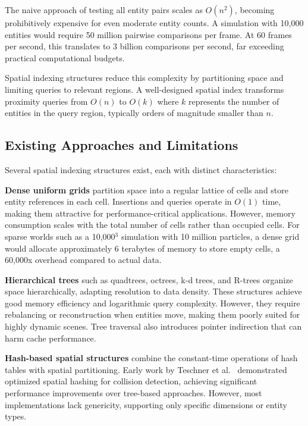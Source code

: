 \documentclass[11pt]{article}
\begin{document}
The naive approach of testing all entity pairs scales as $O(n^2)$, becoming prohibitively expensive for even moderate entity counts. A simulation with 10,000 entities would require 50 million pairwise comparisons per frame. At 60 frames per second, this translates to 3 billion comparisons per second, far exceeding practical computational budgets.

Spatial indexing structures reduce this complexity by partitioning space and limiting queries to relevant regions. A well-designed spatial index transforms proximity queries from $O(n)$ to $O(k)$ where $k$ represents the number of entities in the query region, typically orders of magnitude smaller than $n$.

\subsection{Existing Approaches and Limitations}

Several spatial indexing structures exist, each with distinct characteristics:

\textbf{Dense uniform grids} partition space into a regular lattice of cells and store entity references in each cell. Insertions and queries operate in $O(1)$ time, making them attractive for performance-critical applications. However, memory consumption scales with the total number of cells rather than occupied cells. For sparse worlds such as a 10,000$^3$ simulation with 10 million particles, a dense grid would allocate approximately 6 terabytes of memory to store empty cells, a 60,000x overhead compared to actual data.

\textbf{Hierarchical trees} such as quadtrees, octrees, k-d trees, and R-trees organize space hierarchically, adapting resolution to data density. These structures achieve good memory efficiency and logarithmic query complexity. However, they require rebalancing or reconstruction when entities move, making them poorly suited for highly dynamic scenes. Tree traversal also introduces pointer indirection that can harm cache performance.

\textbf{Hash-based spatial structures} combine the constant-time operations of hash tables with spatial partitioning. Early work by Teschner et al.~\cite{teschner2003} demonstrated optimized spatial hashing for collision detection, achieving significant performance improvements over tree-based approaches. However, most implementations lack genericity, supporting only specific dimensions or entity types.
\end{document}
